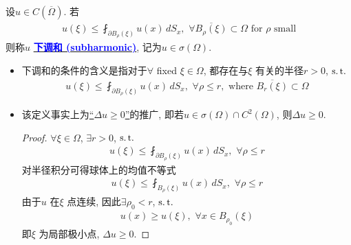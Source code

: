 	\begin{defn}\label{def 3.6.1}
		设$u \in C \left( \overline{\Omega} \right)$. 若
		\begin{align*}
			u(\xi) \leq \fint_{\partial B_{\rho}(\xi)} u(x) \, dS_x , \,\, \forall \overline{B_{\rho}(\xi)} \subset \Omega \,\, \text{for $\rho$ small}
		\end{align*}
		则称$u$ \underline{\textcolor{blue}{\textbf{下调和 (subharmonic)}}}, 记为$u \in \sigma(\Omega)$. 
		
		\vspace*{4em}
		
		\begin{rmk}
			\begin{itemize}
				\item 下调和的条件的含义是指对于$\forall$ fixed $\xi \in \Omega$, 都存在与$\xi$ 有关的半径$r > 0$, $\operatorname{s.t.}$
				\begin{align*}
					u(\xi) \leq \fint_{\partial B_{\rho}(\xi)} u(x) \, dS_x , \,\, \forall \rho \leq r , \,\, \text{where} \,\, \overline{B_{r}(\xi)} \subset \Omega
				\end{align*}
				
				\vspace*{4em}
				
				\item 该定义事实上为\underline{“$\Delta u \geq 0$”}的推广, 即若$u \in \sigma(\Omega) \cap C^2(\Omega)$, 则$\Delta u \geq 0$. 
				
				\vspace*{2em}
				
				\begin{proof}
					$\forall \xi \in \Omega$, $\exists r > 0$, $\operatorname{s.t.}$
					\begin{align*}
						u(\xi) \leq \fint_{\partial B_{\rho}(\xi)} u(x) \, dS_x , \,\, \forall \rho \leq r
					\end{align*}
					对半径积分可得球体上的均值不等式
					\begin{align*}
						u(\xi) \leq \fint_{B_{\rho}(\xi)} u(x) \, dS_x , \,\, \forall \rho \leq r
					\end{align*}
					由于$u$ 在$\xi$ 点连续, 因此$\exists \rho_0 < r$, $\operatorname{s.t.}$
					\begin{align*}
						u(x) \geq u(\xi) , \,\, \forall x \in B_{\rho_0}(\xi)
					\end{align*}
					即$\xi$ 为局部极小点, $\Delta u \geq 0$. 
				\end{proof}
			\end{itemize}
		\end{rmk}
	\end{defn}

